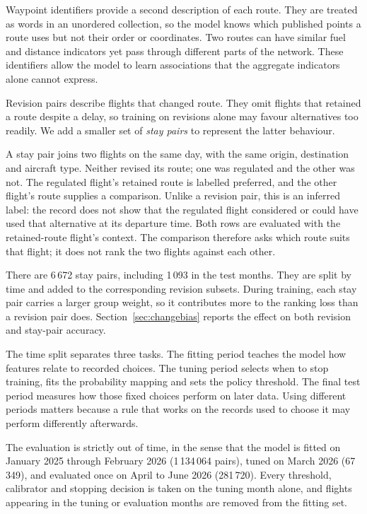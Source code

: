 \documentclass[a4paper,conference]{IEEEtran}
\begin{document}
Waypoint identifiers provide a second description of each route. They
are treated as words in an unordered collection, so the model knows
which published points a route uses but not their order or coordinates.
Two routes can have similar fuel and distance indicators yet pass through
different parts of the network. These identifiers allow the model to
learn associations that the aggregate indicators alone cannot express.

Revision pairs describe flights that changed route. They omit flights
that retained a route despite a delay, so training on revisions alone
may favour alternatives too readily. We add a smaller set of
\emph{stay pairs} to represent the latter behaviour.

A stay pair joins two flights on the same day, with the same origin,
destination and aircraft type. Neither revised its route; one was
regulated and the other was not. The regulated flight's retained route
is labelled preferred, and the other flight's route supplies a comparison.
Unlike a revision pair, this is an inferred label: the record does not
show that the regulated flight considered or could have used that
alternative at its departure time. Both rows are evaluated with the
retained-route flight's context. The comparison therefore asks which
route suits that flight; it does not rank the two flights against each other.

There are 6\,672 stay pairs, including 1\,093 in the test months. They
are split by time and added to the corresponding revision subsets.
During training, each stay pair carries a larger group weight, so it
contributes more to the ranking loss than a revision pair does.
Section~\ref{sec:changebias} reports the effect on
both revision and stay-pair accuracy.

The time split separates three tasks. The fitting period teaches the
model how features relate to recorded choices. The tuning period selects
when to stop training, fits the probability mapping and sets the policy
threshold. The final test period measures how those fixed choices perform
on later data. Using different periods matters because a rule that works
on the records used to choose it may perform differently afterwards.

The evaluation is strictly out of time, in the sense that the model is
fitted on January 2025 through February 2026 (1\,134\,064 pairs), tuned on
March 2026 (67\,349), and evaluated once on April to June 2026
(281\,720). Every threshold, calibrator and stopping decision is taken on
the tuning month alone, and flights appearing in the tuning or evaluation
months are removed from the fitting set.
\end{document}
